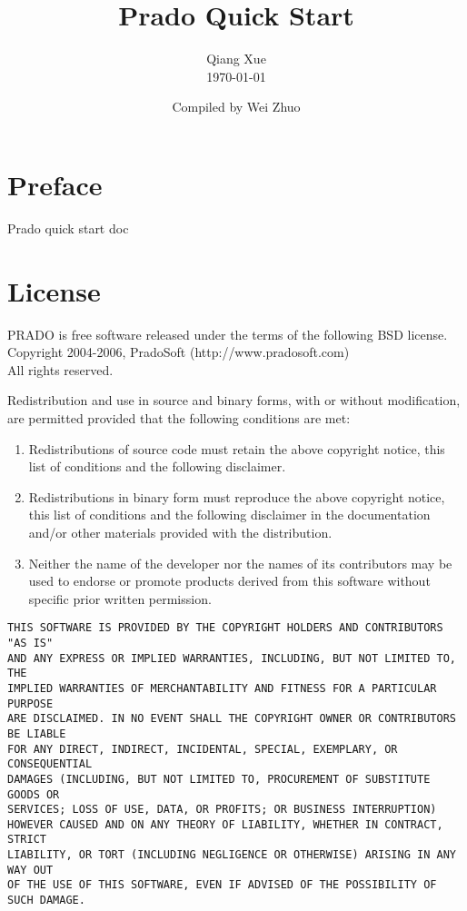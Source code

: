 \documentclass{book}
\title{\Huge \bfseries Prado Quick Start}
\author{Qiang Xue \\[7mm] \today}
\date{ Compiled by Wei Zhuo}
\begin{document}
\maketitle 

\pagestyle{plain}
\tableofcontents

\chapter*{Preface}
Prado quick start doc

\chapter*{License}
PRADO is free software released under the terms of the following BSD license.\\
Copyright 2004-2006, PradoSoft (http://www.pradosoft.com)\\
All rights reserved.

Redistribution and use in source and binary forms, with or without
modification, are permitted provided that the following conditions are met:
\begin{enumerate}
	\item Redistributions of source code must retain the above copyright notice,
this list of conditions and the following disclaimer.

 \item Redistributions in binary form must reproduce the above copyright notice,
this list of conditions and the following disclaimer in the documentation
and/or other materials provided with the distribution.

\item Neither the name of the developer nor the names of its contributors may
be used to endorse or promote products derived from this software without
specific prior written permission.
\end{enumerate}

\begin{verbatim}
THIS SOFTWARE IS PROVIDED BY THE COPYRIGHT HOLDERS AND CONTRIBUTORS "AS IS"
AND ANY EXPRESS OR IMPLIED WARRANTIES, INCLUDING, BUT NOT LIMITED TO, THE
IMPLIED WARRANTIES OF MERCHANTABILITY AND FITNESS FOR A PARTICULAR PURPOSE
ARE DISCLAIMED. IN NO EVENT SHALL THE COPYRIGHT OWNER OR CONTRIBUTORS BE LIABLE
FOR ANY DIRECT, INDIRECT, INCIDENTAL, SPECIAL, EXEMPLARY, OR CONSEQUENTIAL
DAMAGES (INCLUDING, BUT NOT LIMITED TO, PROCUREMENT OF SUBSTITUTE GOODS OR
SERVICES; LOSS OF USE, DATA, OR PROFITS; OR BUSINESS INTERRUPTION)
HOWEVER CAUSED AND ON ANY THEORY OF LIABILITY, WHETHER IN CONTRACT, STRICT
LIABILITY, OR TORT (INCLUDING NEGLIGENCE OR OTHERWISE) ARISING IN ANY WAY OUT
OF THE USE OF THIS SOFTWARE, EVEN IF ADVISED OF THE POSSIBILITY OF SUCH DAMAGE.
\end{verbatim}


\newpage

\pagestyle{fancyplain}









\end{document}
